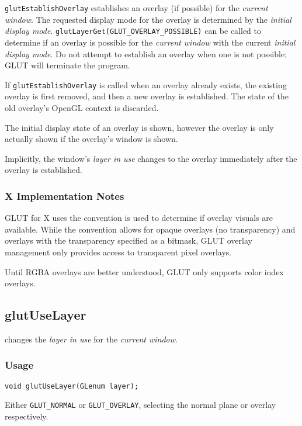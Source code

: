 {\tt glutEstablishOverlay} establishes an overlay (if possible) for
the {\em current window}.  The requested display mode for the overlay is 
determined by the {\em initial display mode}.
{\tt glutLayerGet(GLUT\_OVERLAY\_POSSIBLE)} can be called to determine
if an overlay is possible for the {\em current window} with the
current {\em initial display mode}.  Do not attempt to establish an
overlay when one is not possible; GLUT will terminate the program.

If {\tt glutEstablishOverlay}
is called when an overlay already exists, the existing overlay is first
removed, and then a new overlay is established.  The state of the old overlay's
OpenGL context is discarded.

The initial display state of an overlay is shown, however the overlay
is only actually shown if the overlay's window is shown.

Implicitly, the window's {\em layer in use} changes to the overlay immediately
after the overlay is established.

\subsubsection*{X Implementation Notes}

GLUT for X uses the  convention \cite{kilgard93-layers}
is used to determine if overlay visuals are available.  While the convention
allows for opaque overlays (no transparency) and overlays with the transparency
specified as a bitmask, GLUT overlay management only provides access to transparent
pixel overlays.

Until RGBA overlays are better understood, GLUT only supports color index overlays.

\subsection{glutUseLayer}

 changes the {\em layer in use} for the {\em current window}.

\subsubsection*{Usage}

\begin{verbatim}
void glutUseLayer(GLenum layer);
\end{verbatim}
\begin{description}
\itemsep 0in
\item[{\tt layer}]
Either {\tt GLUT\_NORMAL} or {\tt GLUT\_OVERLAY}, selecting the normal plane or
overlay respectively.
\end{description}

